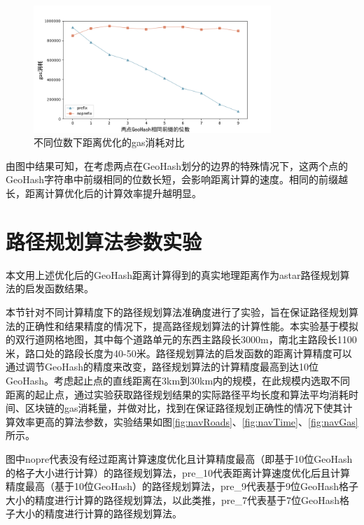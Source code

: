 \begin{figure}[h]
  \centering
  \includegraphics[height=0.3\textheight,width=0.8\textwidth]{figures/不同位数优化gas}
  \caption{不同位数下距离优化的gas消耗对比}\label{fig:diffBetterGas}
\end{figure}

由图中结果可知，在考虑两点在GeoHash划分的边界的特殊情况下，这两个点的GeoHash字符串中前缀相同的位数长短，会影响距离计算的速度。相同的前缀越长，距离计算优化后的计算效率提升越明显。

\section{路径规划算法参数实验}
本文用上述优化后的GeoHash距离计算得到的真实地理距离作为astar路径规划算法的启发函数结果。

本节针对不同计算精度下的路径规划算法准确度进行了实验，旨在保证路径规划算法的正确性和结果精度的情况下，提高路径规划算法的计算性能。本实验基于模拟的双行道网格地图，其中每个道路单元的东西主路段长3000m，南北主路段长1100米，路口处的路段长度为40-50米。路径规划算法的启发函数的距离计算精度可以通过调节GeoHash的精度来改变，路径规划算法的计算精度最高到达10位GeoHash。考虑起止点的直线距离在3km到30km内的规模，在此规模内选取不同距离的起止点，通过实验获取路径规划结果的实际路径平均长度和算法平均消耗时间、区块链的gas消耗量，并做对比，找到在保证路径规划正确性的情况下使其计算效率更高的算法参数，实验结果如图\ref{fig:navRoads}、\ref{fig:navTime}、\ref{fig:navGas}所示。

图中nopre代表没有经过距离计算速度优化且计算精度最高（即基于10位GeoHash的格子大小进行计算）的路径规划算法，pre\_10代表距离计算速度优化后且计算精度最高（基于10位GeoHash）的路径规划算法，pre\_9代表基于9位GeoHash格子大小的精度进行计算的路径规划算法，以此类推，pre\_7代表基于7位GeoHash格子大小的精度进行计算的路径规划算法。

